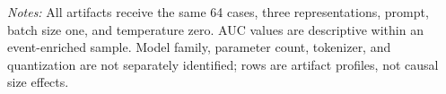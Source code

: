 \begin{table}[!htbp]
\centering
\caption{Target-Aligned Profiles of Four Frozen Artifacts}
\label{tab:artifacts}
\begin{minipage}{\textwidth}\footnotesize
\textit{Notes:} All artifacts receive the same 64 cases, three representations, prompt, batch size one, and temperature zero. AUC values are descriptive within an event-enriched sample. Model family, parameter count, tokenizer, and quantization are not separately identified; rows are artifact profiles, not causal size effects.
\end{minipage}
\end{table}
